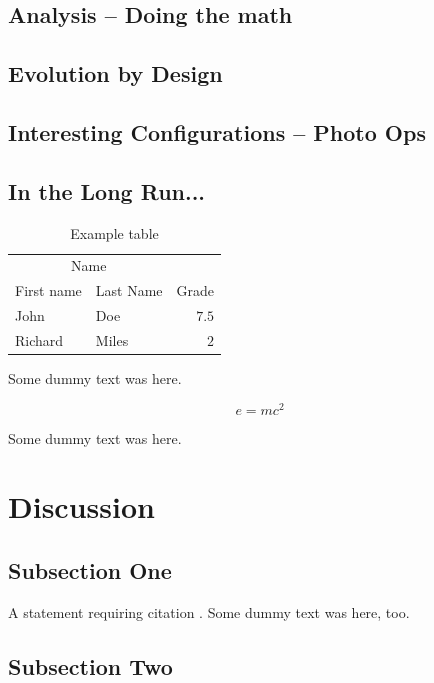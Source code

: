 \documentclass[twoside,twocolumn]{article}
\begin{document}
\subsection{Analysis -- Doing the math}

\subsection{Evolution by Design}

\subsection{Interesting Configurations -- Photo Ops}

\subsection{In the Long Run...}

\begin{table}
\caption{Example table}
\centering
\begin{tabular}{llr}
\toprule
\multicolumn{2}{c}{Name} \\
\cmidrule(r){1-2}
First name & Last Name & Grade \\
\midrule
John & Doe & $7.5$ \\
Richard & Miles & $2$ \\
\bottomrule
\end{tabular}
\end{table}

Some dummy text was here.

\begin{equation}
\label{eq:emc}
e = mc^2
\end{equation}

Some dummy text was here.


\section{Discussion}

\subsection{Subsection One}

A statement requiring citation \cite{Figueredo:2009dg}.
Some dummy text was here, too.

\subsection{Subsection Two}
\end{document}
